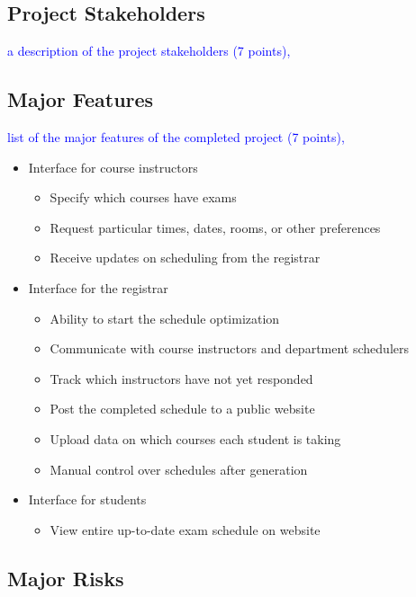 \documentclass[11pt]{article}
\begin{document}
\subsection{Project Stakeholders} %
\textcolor{blue}{a description of the project stakeholders (7 points),}


\subsection{Major Features} %
\textcolor{blue}{ list of the major features of the completed project (7 points),}
\begin{itemize}
\item Interface for course instructors
  \begin{itemize}
  \item Specify which courses have exams
  \item Request particular times, dates, rooms, or other preferences
  \item Receive updates on scheduling from the registrar
  \end{itemize}
\item Interface for the registrar
  \begin{itemize}
  \item Ability to start the schedule optimization
  \item Communicate with course instructors and department schedulers
  \item Track which instructors have not yet responded
  \item Post the completed schedule to a public website
  \item Upload data on which courses each student is taking %
  \item Manual control over schedules after generation
  \end{itemize}
\item Interface for students
  \begin{itemize}
  \item View entire up-to-date exam schedule on website
  \end{itemize}
\end{itemize}

\subsection{Major Risks} %
\end{document}
